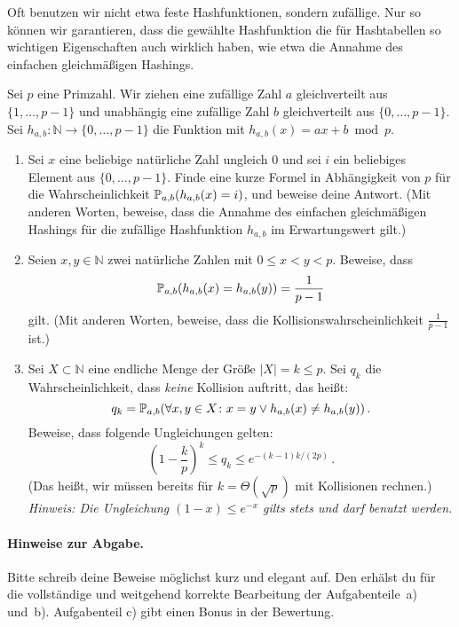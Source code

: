 \documentclass{uebung_cs}
\begin{document}
Oft benutzen wir nicht etwa feste Hashfunktionen, sondern zufällige.
Nur so können wir garantieren, dass die gewählte Hashfunktion die für Hashtabellen so wichtigen Eigenschaften auch wirklich haben, wie etwa die Annahme des einfachen gleichmäßigen Hashings.

Sei $p$ eine Primzahl.
Wir ziehen eine zufällige Zahl $a$ gleichverteilt aus $\{1,\dots,p-1\}$ und unabhängig eine zufällige Zahl $b$ gleichverteilt aus $\{0,\dots,p-1\}$.
Sei $h_{a,b}\colon\mathbb N\to\{0,\dots,p-1\}$ die Funktion mit $h_{a,b}(x)=ax+b\bmod p$.

\begin{enumerate}
    \item Sei $x$ eine beliebige natürliche Zahl ungleich $0$ und sei $i$ ein beliebiges Element aus $\{0,\dots,p-1\}$.
    Finde eine kurze Formel in Abhängigkeit von $p$ für die Wahrscheinlichkeit $\mathbb P_{a,b}(h_{a,b}(x)=i)$, und beweise deine Antwort. (Mit anderen Worten, beweise, dass die Annahme des einfachen gleichmäßigen Hashings für die zufällige Hashfunktion $h_{a,b}$ im Erwartungswert gilt.)
    \item Seien $x,y\in\mathbb N$ zwei natürliche Zahlen mit $0\le x<y<p$.
    Beweise, dass \[\mathbb P_{a,b}(h_{a,b}(x)=h_{a,b}(y))=\frac{1}{p-1}\] gilt. (Mit anderen Worten, beweise, dass die Kollisionswahrscheinlichkeit $\frac{1}{p-1}$ ist.)
    \item Sei $X\subset\mathbb N$ eine endliche Menge der Größe $|X|=k\le p$. Sei $q_k$ die Wahrscheinlichkeit, dass \emph{keine} Kollision auftritt, das heißt:
    \[q_k=\mathbb P_{a,b}(\forall x,y\in X\colon x=y \vee h_{a,b}(x)\ne h_{a,b}(y))\,.\]
    Beweise, dass folgende Ungleichungen gelten:
    \[
        \left(1-\frac{k}{p}\right)^k\le q_k \leq e^{-(k-1)k/(2p)}\,.
    \]
    (Das heißt, wir müssen bereits für $k=\Theta(\sqrt{p})$ mit Kollisionen rechnen.)\\
    \emph{Hinweis: Die Ungleichung $(1-x)\le e^{-x}$ gilts stets und darf benutzt werden.}
\end{enumerate}

\paragraph*{Hinweise zur Abgabe.}
Bitte schreib deine Beweise möglichst kurz und elegant auf.
Den  erhälst du für die vollständige und weitgehend korrekte Bearbeitung der Aufgabenteile~a) und~b). Aufgabenteil c) gibt einen Bonus in der Bewertung.
\end{document}
